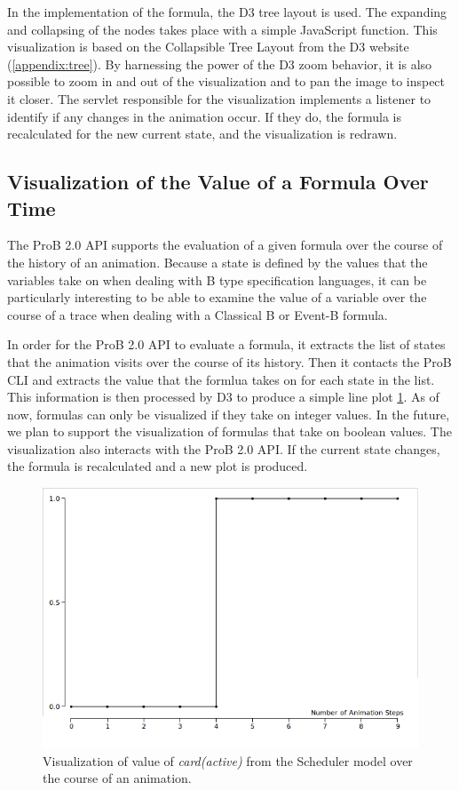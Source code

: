 In the implementation of the formula, the D3 tree layout is used. The expanding and collapsing of the nodes takes place with a simple JavaScript function. This visualization is based on the Collapsible Tree Layout from the D3 website (\ref{appendix:tree}). By harnessing the power of the D3 zoom behavior, it is also possible to zoom in and out of the visualization and to pan the image to inspect it closer. The servlet responsible for the visualization implements a listener to identify if any changes in the animation occur. If they do, the formula is recalculated for the new current state, and the visualization is redrawn.

\subsection{Visualization of the Value of a Formula Over Time}

The ProB 2.0 API supports the evaluation of a given formula over the course of the history of an animation.
Because a state is defined by the values that the variables take on when dealing with B type specification languages, it can be particularly interesting to be able to examine the value of a variable over the course of a trace when dealing with a Classical B or Event-B formula. 

In order for the ProB 2.0 API to evaluate a formula, it extracts the list of states that the animation visits over the course of its history. Then it contacts the ProB CLI and extracts the value that the formlua takes on for each state in the list. This information is then processed by D3 to produce a simple line plot \ref{timeVsValue}. As of now, formulas can only be visualized if they take on integer values. In the future, we plan to support the visualization of formulas that take on boolean values. The visualization also interacts with the ProB 2.0 API. If the current state changes, the formula is recalculated and a new plot is produced.

\begin{figure}[h!]
\centering
\includegraphics[width=15cm]{bilder/timeVsValue.png}
\caption{Visualization of value of \emph{card(active)} from the Scheduler model over the course of an animation.}
\label{timeVsValue}
\end{figure}


